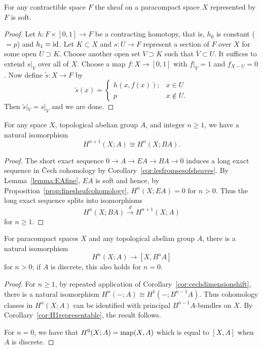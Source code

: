 \documentclass[a4paper,openany]{scrbook}
\begin{document}
\begin{lemma}\label{lemma:EAfine}
For any contractible space $F$ the sheaf on a paracompact space $X$ represented by $F$ is soft.
\end{lemma}
\begin{proof}
Let $h\colon F \times [0,1] \to F$ be a contracting homotopy, that is, $h_0$ is constant ($=p$) and $h_1=\operatorname{id}$. Let $K \subset X$ and $s\colon U \to F$ represent a section of $F$ over $X$ for some open $U \supset K$. Choose another open set $V \supset K$ such that $\overline V \subset U$. It suffices to extend $s|_V$ over all of $X$. Choose a map $f\colon X \to [0,1]$ with $f|_{\overline V} = 1$ and $f_{X-U}=0$. Now define $\tilde s\colon X \to F$ by
\[
\tilde s(x) = \begin{cases} h(x,f(x)); & x \in U\\
p\; & x \not\in U.\end{cases}
\]
Then $\tilde s|_V = s|_V$ and we are done.
\end{proof}

\begin{corollary} \label{cor:cechdimensionshift}
For any space $X$, topological abelian group $A$, and integer $n\geq 1$, we have a natural isomorphism
\[
H^{n+1}(X;A) \cong H^n(X;BA).
\]
\end{corollary}
\begin{proof}
The short exact sequence $0 \to A \to EA \to BA \to 0$ induces a long exact sequence in \v Cech cohomology by Corollary~\ref{cor:lesfromsesofsheaves}. By Lemma~\ref{lemma:EAfine}, $EA$ is soft and hence, by Proposition~\ref{prop:finesheafcohomology}, $H^n(X;EA)=0$ for $n>0$. Thus the long exact sequence splits into isomorphisms
\[
H^n(X;BA) \xrightarrow{d} H^{n+1}(X;A)
\]
for $n \geq 1$.
\end{proof}

\begin{corollary}\label{cor:cohomologyrepresentable}
For paracompact spaces $X$ and any topological abelian group $A$, there is a natural isomorphism
\[
H^n(X;A) \to [X,B^nA]
\]
for $n>0$; if $A$ is discrete, this also holds for $n=0$.
\end{corollary}
\begin{proof}
For $n\geq 1$, by repeated application of Corollary~\ref{cor:cechdimensionshift}, there is a natural isomorphism $H^n(-;A) \cong H^1(-;B^{n-1}A)$. Thus cohomology classes in $H^n(X;A)$ can be identified with principal $B^{n-1}A$-bundles on $X$. By Corollary~\ref{cor:H1representable}, the result follows.

For $n=0$, we have that $H^0(X;A) = \operatorname{map}(X,A)$ which is equal to $[X,A]$ when $A$ is discrete.
\end{proof}
\end{document}
